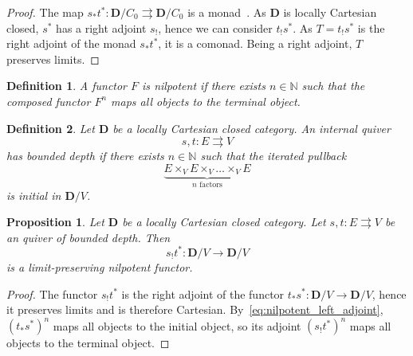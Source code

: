 \documentclass[12pt]{article}
\newtheorem{definition}{Definition}
\newtheorem{proposition}{Proposition}
\newcommand{\N}{{\mathbb{N}}}
\newcommand{\DCat}{{\mathbf{D}}}
\begin{document}
\begin{proof}
    The map $s_*t^*\colon \DCat/C_0 \rightrightarrows \DCat/C_0$ is a monad~\cite[Thm.~V.8.2]{Mac_Lane_1994}. As $\DCat$ is locally Cartesian closed, $s^*$ has a right adjoint $s_!$, hence we can consider $t_!s^*$. As $T = t_!s^*$ is the right adjoint of the monad $s_*t^*$, it is a comonad. Being a right adjoint, $T$ preserves limits.
\end{proof}

\begin{definition}\label{def:nilpotent_functor}
    A functor $F$ is {\em nilpotent} if there exists $n \in \N$ such that the composed functor $F^n$ maps all objects to the terminal object.
\end{definition}

\begin{definition}\label{def:internal_quiver_bounded_depth}
    Let $\DCat$ be a locally Cartesian closed category. An internal quiver
    \begin{equation*}
        s, t\colon E \rightrightarrows V
    \end{equation*}
    {\em has bounded depth} if there exists $n \in \N$ such that the iterated pullback
    \begin{equation}\label{eq:nilpotent_left_adjoint}
        \underbrace{E \times_V E \times_V \dots \times_V E}_{n \text{ factors}}
    \end{equation}
    is initial in $\DCat/V$.
\end{definition}

\begin{proposition}\label{prop:internal_quiver_functor}
    Let $\DCat$ be a locally Cartesian closed category. Let $s, t\colon E \rightrightarrows V$ be an quiver of bounded depth. Then
    \begin{equation*}
        s_!t^*\colon \DCat/V \rightarrow \DCat/V
    \end{equation*}
    is a limit-preserving nilpotent functor.
\end{proposition}

\begin{proof}
    The functor $s_!t^*$ is the right adjoint of the functor  $t_*s^*\colon \DCat/V \rightarrow \DCat/V$, hence it preserves limits and is therefore Cartesian. By~\cref{eq:nilpotent_left_adjoint}, $(t_*s^*)^n$ maps all objects to the initial object, so its adjoint $(s_!t^*)^n$ maps all objects to the terminal object.
\end{proof}
\end{document}
